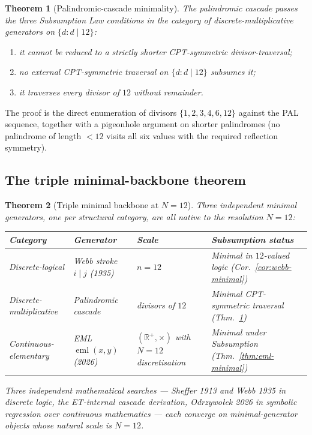 \documentclass[11pt,a4paper]{article}
\newtheorem{theorem}{Theorem}[section]
\theoremstyle{definition}
\theoremstyle{remark}
\newcommand{\R}{\mathbb{R}}
\begin{document}
\begin{theorem}[Palindromic-cascade minimality]\label{thm:palindromic-minimal}
The palindromic cascade passes the three Subsumption Law conditions in the category of discrete-multiplicative generators on $\{d : d \mid 12\}$:
\begin{enumerate}[label=(\roman*),leftmargin=*]
\item it cannot be reduced to a strictly shorter CPT-symmetric divisor-traversal;
\item no external CPT-symmetric traversal on $\{d:d\mid 12\}$ subsumes it;
\item it traverses every divisor of $12$ without remainder.
\end{enumerate}
\end{theorem}

The proof is the direct enumeration of divisors $\{1,2,3,4,6,12\}$ against the PAL sequence, together with a pigeonhole argument on shorter palindromes (no palindrome of length $<12$ visits all six values with the required reflection symmetry).

\subsection{The triple minimal-backbone theorem}\label{subsec:triple-backbone}

\begin{theorem}[Triple minimal backbone at $N=12$]\label{thm:triple-backbone}
Three independent minimal generators, one per structural category, are all native to the resolution $N=12$:
\begin{center}
\begin{tabularx}{\textwidth}{@{}lXlX@{}}
\toprule
Category & Generator & Scale & Subsumption status\\
\midrule
Discrete-logical & Webb stroke $i\mathbin{|}j$ (1935) & $n=12$ & Minimal in $12$-valued logic (Cor.~\ref{cor:webb-minimal})\\
Discrete-multiplicative & Palindromic cascade & divisors of $12$ & Minimal CPT-symmetric traversal (Thm.~\ref{thm:palindromic-minimal})\\
Continuous-elementary & EML $\operatorname{eml}(x,y)$ (2026) & $(\R^{+},\times)$ with $N=12$ discretisation & Minimal under Subsumption (Thm.~\ref{thm:eml-minimal})\\
\bottomrule
\end{tabularx}
\end{center}
Three independent mathematical searches --- Sheffer 1913 and Webb 1935 in discrete logic, the ET-internal cascade derivation, Odrzywołek 2026 in symbolic regression over continuous mathematics --- each converge on minimal-generator objects whose natural scale is $N=12$.
\end{theorem}
\end{document}
